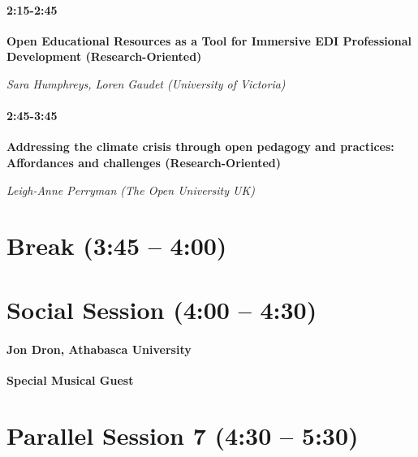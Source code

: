 \documentclass[
]{book}
\begin{document}
\begin{secondary}
\hypertarget{section}{%
\paragraph{2:15-2:45}\label{section}}

\textbf{Open Educational Resources as a Tool for Immersive EDI
Professional Development (Research-Oriented)}

\emph{Sara Humphreys, Loren Gaudet (University of Victoria)}
\end{secondary}

\begin{secondary}
\hypertarget{section}{%
\paragraph{2:45-3:45}\label{section}}

\textbf{Addressing the climate crisis through open pedagogy and
practices: Affordances and challenges (Research-Oriented)}

\emph{Leigh-Anne Perryman (The Open University UK)}
\end{secondary}

\hypertarget{break-345-400-1}{%
\section*{Break (3:45 -- 4:00)}\label{break-345-400-1}}

\hypertarget{social-session-400-430-1}{%
\section*{Social Session (4:00 -- 4:30)}\label{social-session-400-430-1}}

\begin{gh}
\hypertarget{jon-dron-athabasca-university}{%
\paragraph{Jon Dron, Athabasca
University}\label{jon-dron-athabasca-university}}

\textbf{Special Musical Guest}
\end{gh}

\hypertarget{parallel-session-7-430-530}{%
\section*{Parallel Session 7 (4:30 -- 5:30)}\label{parallel-session-7-430-530}}
\end{document}
